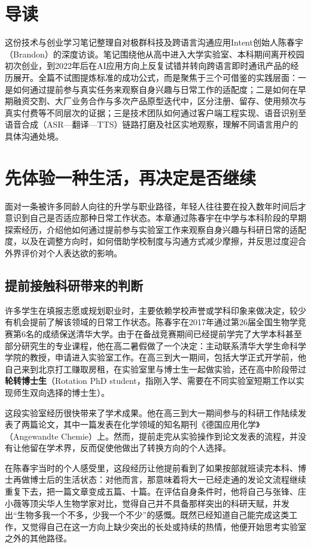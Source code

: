 \documentclass[UTF8,a4paper,11pt,fontset=fandol]{ctexart}
\begin{document}
\section*{导读}
这份技术与创业学习笔记整理自对极群科技及跨语言沟通应用Intent创始人陈春宇（Brandon）的深度访谈。笔记围绕他从高中进入大学实验室、本科期间离开校园初次创业，到2022年后在AI应用方向上反复试错并转向跨语言即时通讯产品的经历展开。全篇不试图提炼标准的成功公式，而是聚焦于三个可借鉴的实践层面：一是如何通过提前参与真实任务来观察自身兴趣与日常工作的适配度；二是如何在早期融资交割、大厂业务合作与多次产品原型迭代中，区分注册、留存、使用频次与真实付费等不同层次的证据；三是技术团队如何通过客户端工程实现、语音识别至语音合成（ASR—翻译—TTS）链路打磨及社区实地观察，理解不同语言用户的具体沟通处境。
\section{先体验一种生活，再决定是否继续}
面对一条被许多同龄人向往的升学与职业路径，年轻人往往要在投入数年时间后才意识到自己是否适应那种日常工作状态。本章通过陈春宇在中学与本科阶段的早期探索经历，介绍他如何通过提前参与实验室工作来观察自身兴趣与科研日常的适配度，以及在调整方向时，如何借助学校制度与沟通方式减少摩擦，并反思过度迎合外界评价对个人表达欲的影响。
\subsection{提前接触科研带来的判断}
许多学生在填报志愿或规划职业时，主要依赖学校声誉或学科印象来做决定，较少有机会提前了解该领域的日常工作状态。陈春宇在2017年通过第26届全国生物学竞赛第6名的成绩保送清华大学。由于在备战竞赛期间已经提前学完了大学本科甚至部分研究生的专业课程，他在高二暑假做了一个决定：主动联系清华大学生命科学学院的教授，申请进入实验室工作。在高三到大一期间，包括大学正式开学前，他自己来到北京打工赚取房租，在实验室里与博士生一起做实验，还在高中阶段带过\textbf{轮转博士生}（Rotation PhD student，指刚入学、需要在不同实验室短期工作以实现师生双向选择的博士生）。

这段实验室经历很快带来了学术成果。他在高三到大一期间参与的科研工作陆续发表了两篇论文，其中一篇发表在化学领域的知名期刊《德国应用化学》（Angewandte Chemie）上。然而，提前走完从实验操作到论文发表的流程，并没有让他留在学术界，反而促使他做出了转换方向的个人选择。

在陈春宇当时的个人感受里，这段经历让他提前看到了如果按部就班读完本科、博士再做博士后的生活状态：对他而言，那意味着将大一已经走通的发论文流程继续重复下去，把一篇文章变成五篇、十篇。在评估自身条件时，他将自己与张锋、庄小薇等顶尖华人生物学家对比，觉得自己并不具备那样突出的科研天赋，并发出“生物多我一个不多，少我一个不少”的感慨。既然已经知道自己能完成这类工作，又觉得自己在这一方向上缺少突出的长处或持续的热情，他便开始思考实验室之外的其他路径。
\end{document}
